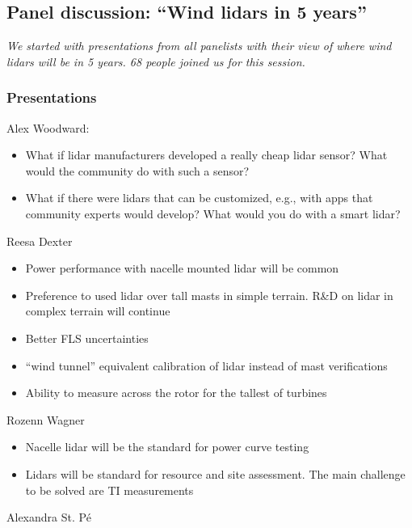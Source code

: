 \subsection{Panel discussion: “Wind lidars in 5 years”}
\emph{We started with presentations from all panelists with their view of where wind lidars will be in 5 years. 68 people joined us for this session.}

\subsubsection{Presentations}
Alex Woodward:
\begin{itemize}
    \item What if lidar manufacturers developed a really cheap lidar sensor? What would the community do with such a sensor? 
    \item What if there were lidars that can be customized, e.g., with apps that community experts would develop? What would you do with a smart lidar?
\end{itemize}
Reesa Dexter
\begin{itemize}
    \item Power performance with nacelle mounted lidar will be common
    \item Preference to used lidar over tall masts in simple terrain. R\&D on lidar in complex terrain will continue
    \item Better FLS uncertainties
    \item “wind tunnel” equivalent calibration of lidar instead of mast verifications
    \item Ability to measure across the rotor for the tallest of turbines    
\end{itemize}
Rozenn Wagner
\begin{itemize}
    \item Nacelle lidar will be the standard for power curve testing
    \item Lidars will be standard for resource and site assessment. The main challenge to be solved are TI measurements
\end{itemize}
Alexandra St. Pé
